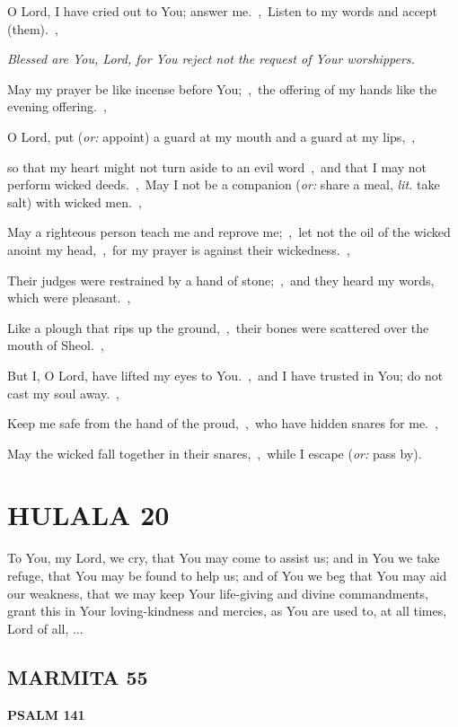 \documentclass[12pt,twoside,a5paper]{article}
\newcommand{\hulala}[1]{\section*{HULALA {#1}}}
\newcommand{\marmita}[1]{\subsection*{MARMITA {#1}}}
\newcommand{\psalm}[1]{\textbf{PSALM {#1}}\nopagebreak}
\newcommand{\qanona}[1]{{\liturgicalhint{Qanona.} \emph{#1}}}
\newcommand{\slota}[1]{\liturgicalhint{Slota.} #1}
\newcommand{\translationoption}[1]{\emph{or:} #1}
\newcommand{\translationliteral}[1]{\emph{lit.} #1}
\begin{document}
\begin{normalparskip}
  O Lord, I have cried out to You; answer me.~\sep\ Listen to my words and accept (them).~\sep

  \qanona{Blessed are You, Lord, for You reject not the request of Your worshippers.}

  May my prayer be like incense before You;~\sep\ the offering of my hands like the evening offering.~\sep

  O Lord, put (\translationoption{appoint}) a guard at my mouth and a guard at my lips,~\sep

  so that my heart might not turn aside to an evil word~\sep\ and that I may not perform wicked deeds.~\sep\ May I not be a companion (\translationoption{share a meal}, \translationliteral{take salt}) with wicked men.~\sep

  May a righteous person teach me and reprove me;~\sep\ let not the oil of the wicked anoint my head,~\sep\ for my prayer is against their wickedness.~\sep

  Their judges were restrained by a hand of stone;~\sep\ and they heard my words, which were pleasant.~\sep

  Like a plough that rips up the ground,~\sep\ their bones were scattered over the mouth of Sheol.~\sep

  But I, O Lord, have lifted my eyes to You.~\sep\ and I have trusted in You; do not cast my soul away.~\sep

  Keep me safe from the hand of the proud,~\sep\ who have hidden snares for me.~\sep

  May the wicked fall together in their snares,~\sep\ while I escape (\translationoption{pass by}).
\end{normalparskip}


\hulala{20}

\slota{To You, my Lord, we cry, that You may come to assist us; and in You we take refuge, that You may be found to help us; and of You we beg that You may aid our weakness, that we may keep Your life-giving and divine commandments, grant this in Your loving-kindness and mercies, as You are used to, at all times, Lord of all, ...}

\marmita{55}

\psalm{141}
\end{document}
